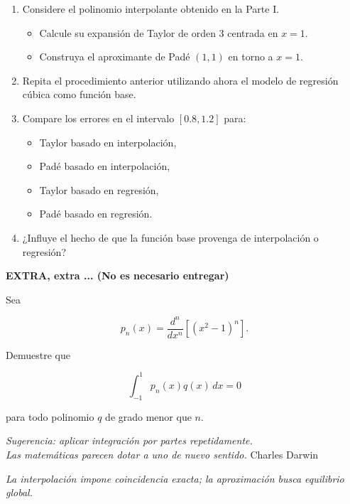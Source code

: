 \documentclass[11pt,a4paper]{article}
\theoremstyle{ejercicio}
\begin{document}
\begin{enumerate}
\begin{enumerate}
\item Considere el polinomio interpolante obtenido en la Parte I.
\begin{itemize}
\item Calcule su expansión de Taylor de orden $3$ centrada en $x=1$.
\item Construya el aproximante de Padé $(1,1)$ en torno a $x=1$.
\end{itemize}
\item Repita el procedimiento anterior utilizando ahora el modelo de regresión cúbica como función base.
\item Compare los errores en el intervalo $[0.8,1.2]$ para:
\begin{itemize}
\item Taylor basado en interpolación,
\item Padé basado en interpolación,
\item Taylor basado en regresión,
\item Padé basado en regresión.
\end{itemize}
\item ¿Influye el hecho de que la función base provenga de interpolación o regresión?
\end{enumerate}



\end{enumerate}

\textbf{EXTRA, extra ... (No es necesario entregar)}

Sea

\[
p_n(x)=\frac{d^n}{dx^n}\left[(x^2-1)^n\right].
\]

Demuestre que

\[
\int_{-1}^{1} p_n(x) q(x)\,dx=0
\]

para todo polinomio $q$ de grado menor que $n$.

\textit{Sugerencia: aplicar integración por partes repetidamente.}\\


\textit{Las matemáticas parecen dotar a uno de nuevo sentido.}
Charles Darwin

\vfill
\begin{center}
\textit{La interpolación impone coincidencia exacta;  
la aproximación busca equilibrio global.}
\end{center}
\end{document}
